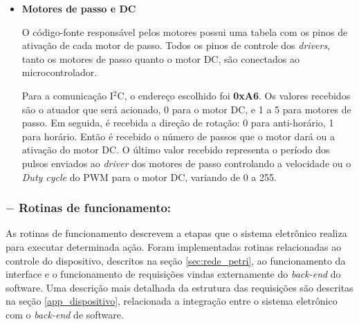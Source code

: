 \begin{itemize}
    \item \textbf{Motores de passo e DC}
    
    O código-fonte responsável pelos motores possui uma tabela com os pinos de ativação de cada motor de passo. Todos os pinos de controle dos \textit{drivers}, tanto os motores de passo quanto o motor DC, são conectados ao microcontrolador.
    
    Para a comunicação I$^2$C, o endereço escolhido foi \textbf{0xA6}. Os valores recebidos são o atuador que será acionado, 0 para o motor DC, e 1 a 5 para motores de passo. Em seguida, é recebida a direção de rotação: 0 para anti-horário, 1 para horário. Então é recebido o número de passos que o motor dará ou a ativação do motor DC. O último valor recebido representa o período dos pulsos enviados ao \textit{driver} dos motores de passo controlando a velocidade ou o \textit{Duty cycle} do PWM para o motor DC, variando de 0 a 255.
    
\end{itemize}

\subsubsection*{$-$ \textbf{Rotinas de funcionamento:}}

As rotinas de funcionamento descrevem a etapas que o sistema eletrônico realiza para executar determinada ação. Foram implementadas rotinas relacionadas ao controle do dispositivo, descritos na seção \ref{sec:rede_petri}, ao funcionamento da interface e o funcionamento de requisições vindas externamente do \textit{back-end} do software. Uma descrição mais detalhada da estrutura das requisições são descritas na seção \ref{app_dispositivo}, relacionada a integração entre o sistema eletrônico com o \textit{back-end} de software.

